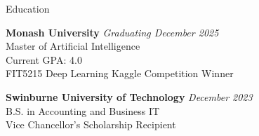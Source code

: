\documentclass[
	11pt, %
]{resume} %
\begin{document}

\begin{rSection}{Education}

	\textbf{Monash University} \hfill \textit{Graduating December 2025} \\
	Master of Artificial Intelligence \\
	Current GPA: 4.0 \\
	FIT5215 Deep Learning Kaggle Competition Winner

	\textbf{Swinburne University of Technology} \hfill \textit{December 2023} \\
	B.S. in Accounting and Business IT \\
	Vice Chancellor's Scholarship Recipient


\end{rSection}

\end{document}
